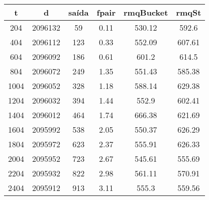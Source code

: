 \begin{tabular}{|c|c|c|c|c|c|}
\hline
\textbf{t} & \textbf{d} & \textbf{saída} & \textbf{fpair} & \textbf{rmqBucket} & \textbf{rmqSt}\\
\hline
204 & 2096132 & 59 & 0.11 & 530.12 & 592.6\\
\hline
404 & 2096112 & 123 & 0.33 & 552.09 & 607.61\\
\hline
604 & 2096092 & 186 & 0.61 & 601.2 & 614.5\\
\hline
804 & 2096072 & 249 & 1.35 & 551.43 & 585.38\\
\hline
1004 & 2096052 & 328 & 1.18 & 588.14 & 629.38\\
\hline
1204 & 2096032 & 394 & 1.44 & 552.9 & 602.41\\
\hline
1404 & 2096012 & 464 & 1.74 & 666.38 & 621.69\\
\hline
1604 & 2095992 & 538 & 2.05 & 550.37 & 626.29\\
\hline
1804 & 2095972 & 623 & 2.37 & 555.91 & 626.33\\
\hline
2004 & 2095952 & 723 & 2.67 & 545.61 & 555.69\\
\hline
2204 & 2095932 & 822 & 2.98 & 561.11 & 570.91\\
\hline
2404 & 2095912 & 913 & 3.11 & 555.3 & 559.56\\
\hline
\end{tabular}
